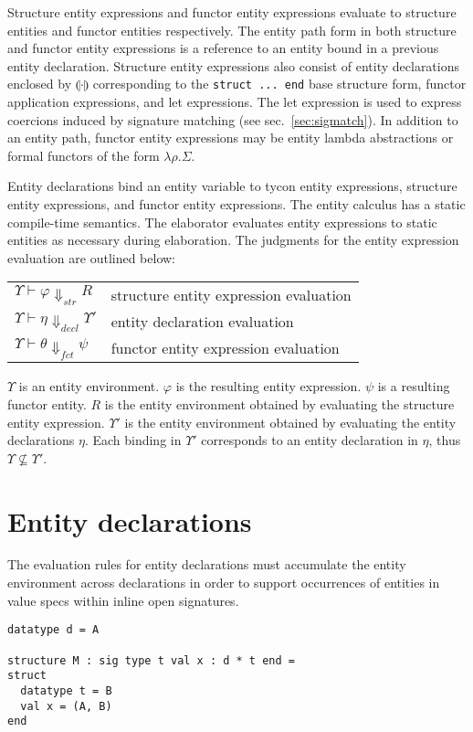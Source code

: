 Structure entity expressions and functor entity expressions evaluate to
structure entities and functor entities respectively. The entity path
form in both structure and functor entity expressions is a reference
to an entity bound in a previous entity declaration. Structure entity
expressions also consist of entity declarations enclosed by
$\llparenthesis\cdot\rrparenthesis$ corresponding to the
\lstinline{struct ... end} base structure form, functor application expressions, and 
let expressions. The let expression is used to express coercions induced by
signature matching (see sec.~\ref{sec:sigmatch}). In addition to an
entity path, functor entity expressions may be entity lambda abstractions or 
formal functors of the form $\lambda\rho.\Sigma$. 
 
Entity declarations bind an entity variable to tycon entity expressions, structure entity
expressions, and functor entity expressions. The entity calculus has a static compile-time semantics. The elaborator evaluates entity expressions to static entities as necessary during elaboration. The judgments for the entity expression evaluation are outlined below:
 
\begin{tabular}{ll}
	$\Upsilon\vdash\varphi \Downarrow_{str} R$ & structure entity expression evaluation \\
	$\Upsilon\vdash\eta \Downarrow_{decl} \Upsilon'$ & entity declaration evaluation \\
	$\Upsilon\vdash\theta \Downarrow_{fct} \psi$ & functor entity expression evaluation
\end{tabular}

$\Upsilon$ is an entity environment. $\varphi$ is the resulting entity expression.  $\psi$ is a resulting functor entity. $R$ is the entity environment obtained by evaluating the structure entity expression. $\Upsilon'$ is the entity environment obtained by evaluating the entity declarations $\eta$. Each binding in $\Upsilon'$ corresponds to an entity declaration in $\eta$, thus $\Upsilon\not\subseteq\Upsilon'$. 

\section{Entity declarations}
The evaluation rules for entity declarations must accumulate the entity environment across declarations in order to support occurrences of entities in value specs within inline open signatures. 

\begin{singlespace}
\begin{lstlisting}
datatype d = A

structure M : sig type t val x : d * t end =
struct
  datatype t = B
  val x = (A, B)
end
\end{lstlisting}
\end{singlespace}

